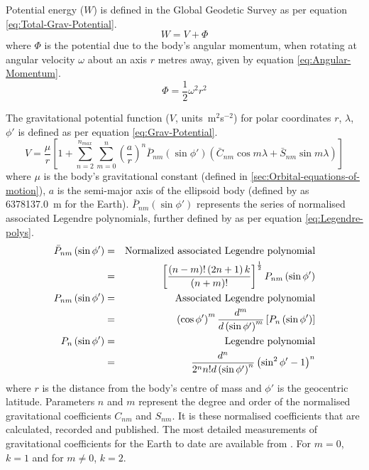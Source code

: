 Potential energy ($W$) is defined in the Global Geodetic Survey \parencite{WGS84} as per equation \eqref{eq:Total-Grav-Potential}.
\begin{equation}\label{eq:Total-Grav-Potential}
W=V+\Phi
\end{equation}
where $\Phi$ is the potential due to the body's angular momentum, when rotating at angular velocity $\omega$ about an axis $r$ metres away, given by equation \eqref{eq:Angular-Momentum}.
\begin{equation}\label{eq:Angular-Momentum}
\Phi=\frac{1}{2}\omega^{2}r^{2}
\end{equation}


The gravitational potential function ($V$, units~m$^{2}$s$^{-2}$) for polar coordinates $r$, $\lambda$, $\phi'$ is defined as per equation \eqref{eq:Grav-Potential}.
\begin{equation} \label{eq:Grav-Potential}
V=\frac{\mu}{r}\left[1+\sum_{n=2}^{n_{max}}\sum_{m=0}^{n}\left(\frac{a}{r}\right)^{n}\bar{P}_{nm}\left(\sin\phi'\right)\left(\bar{C}_{nm}\cos m\lambda+\bar{S}_{nm}\sin m\lambda\right)\right]
\end{equation}
where $\mu$ is the body's gravitational constant (defined in \autoref{sec:Orbital-equations-of-motion}), $a$ is the semi-major axis of the ellipsoid body (defined by \citeauthor{WGS84} as 6378137.0~m for the Earth). $\bar{P}_{nm}\left(\sin\phi'\right)$ represents the series of normalised associated Legendre polynomials, further defined by \textcite{WGS84} as per equation \eqref{eq:Legendre-polys}.
\begin{eqnarray}\label{eq:Legendre-polys}
\bar{P}_{nm}\left(\sin\phi'\right) & = & \text{Normalized associated Legendre polynomial}\\
 & = & \left[\frac{\left(n-m\right)!\left(2n+1\right)k}{\left(n+m\right)!}\right]^{\frac{1}{2}}P_{nm}\left(\sin\phi'\right)\\\notag
P_{nm}\left(\sin\phi'\right) & = & \text{Associated Legendre polynomial}\\
 & = & \left(\cos\phi'\right)^{m}\frac{d^{m}}{d\left(\sin\phi'\right)^{m}}\left[P_{n}\left(\sin\phi'\right)\right]\\\notag
P_{n}\left(\sin\phi'\right) & = & \text{Legendre polynomial}\\
 & = & \frac{d^{n}}{2^{n}n!d\left(\sin\phi'\right)^{n}}\left(\sin^{2}\phi'-1\right)^{n}
\end{eqnarray}
where $r$ is the distance from the body's centre of mass and $\phi'$ is the geocentric latitude. Parameters $n$ and $m$ represent the degree and order of the normalised gravitational coefficients $C_{nm}$ and $S_{nm}$. It is these normalised coefficients that are calculated, recorded and published. The most detailed measurements of gravitational coefficients for the Earth to date are available from \textcite{EIGEN-5C}.  For $m = 0$, $k = 1$ and for $m \neq 0$, $k = 2$. 

